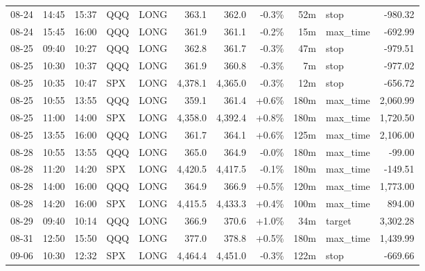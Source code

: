 \documentclass[11pt,a4paper,twoside]{article}
\begin{document}
\begin{center}
\begin{longtable}{>{\color{txtmain}}l l l l l r r r r >{\color{txtmain}}l r}
08-24 & 14:45 & 15:37 & QQQ & LONG & 363.1 & 362.0 & \textcolor{lossred}{-0.3\%} & 52m & stop & \textcolor{lossred}{-980.32} \\
08-24 & 15:45 & 16:00 & QQQ & LONG & 361.9 & 361.1 & \textcolor{lossred}{-0.2\%} & 15m & max\_time & \textcolor{lossred}{-692.99} \\
08-25 & 09:40 & 10:27 & QQQ & LONG & 362.8 & 361.7 & \textcolor{lossred}{-0.3\%} & 47m & stop & \textcolor{lossred}{-979.51} \\
08-25 & 10:30 & 10:37 & QQQ & LONG & 361.9 & 360.8 & \textcolor{lossred}{-0.3\%} & 7m & stop & \textcolor{lossred}{-977.02} \\
08-25 & 10:35 & 10:47 & SPX & LONG & 4,378.1 & 4,365.0 & \textcolor{lossred}{-0.3\%} & 12m & stop & \textcolor{lossred}{-656.72} \\
08-25 & 10:55 & 13:55 & QQQ & LONG & 359.1 & 361.4 & \textcolor{wingreen}{+0.6\%} & 180m & max\_time & \textcolor{wingreen}{2,060.99} \\
08-25 & 11:00 & 14:00 & SPX & LONG & 4,358.0 & 4,392.4 & \textcolor{wingreen}{+0.8\%} & 180m & max\_time & \textcolor{wingreen}{1,720.50} \\
08-25 & 13:55 & 16:00 & QQQ & LONG & 361.7 & 364.1 & \textcolor{wingreen}{+0.6\%} & 125m & max\_time & \textcolor{wingreen}{2,106.00} \\
08-28 & 10:55 & 13:55 & QQQ & LONG & 365.0 & 364.9 & \textcolor{lossred}{-0.0\%} & 180m & max\_time & \textcolor{lossred}{-99.00} \\
08-28 & 11:20 & 14:20 & SPX & LONG & 4,420.5 & 4,417.5 & \textcolor{lossred}{-0.1\%} & 180m & max\_time & \textcolor{lossred}{-149.51} \\
08-28 & 14:00 & 16:00 & QQQ & LONG & 364.9 & 366.9 & \textcolor{wingreen}{+0.5\%} & 120m & max\_time & \textcolor{wingreen}{1,773.00} \\
08-28 & 14:20 & 16:00 & SPX & LONG & 4,415.5 & 4,433.3 & \textcolor{wingreen}{+0.4\%} & 100m & max\_time & \textcolor{wingreen}{894.00} \\
08-29 & 09:40 & 10:14 & QQQ & LONG & 366.9 & 370.6 & \textcolor{wingreen}{+1.0\%} & 34m & target & \textcolor{wingreen}{3,302.28} \\
08-31 & 12:50 & 15:50 & QQQ & LONG & 377.0 & 378.8 & \textcolor{wingreen}{+0.5\%} & 180m & max\_time & \textcolor{wingreen}{1,439.99} \\
09-06 & 10:30 & 12:32 & SPX & LONG & 4,464.4 & 4,451.0 & \textcolor{lossred}{-0.3\%} & 122m & stop & \textcolor{lossred}{-669.66} \\

\end{longtable}
\end{center}
\end{document}

